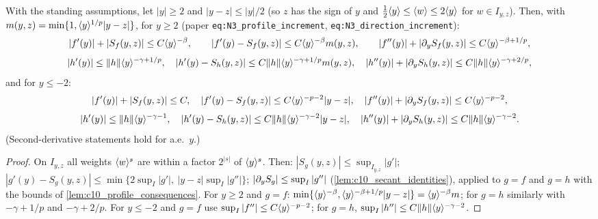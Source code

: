 \begin{lemma}
  \label{lem:c10_near_increments}
  With the standing assumptions, let $|y|\ge2$ and $|y-z|\le|y|/2$ (so $z$ has the sign of $y$ and
  $\frac12\langle y \rangle\le\langle w \rangle\le2\langle y \rangle$ for $w\in I_{y,z}$). Then, with $m(y,z)=\min\{1,\langle y \rangle^{1/p}|y-z|\}$,
  for $y\ge2$ (paper \texttt{eq:N3\_profile\_increment}, \texttt{eq:N3\_direction\_increment}):
  \[
    |f'(y)|+|S_f(y,z)|\le C\langle y \rangle^{-\beta},\qquad |f'(y)-S_f(y,z)|\le C\langle y \rangle^{-\beta}m(y,z),\qquad
    |f''(y)|+|\partial_yS_f(y,z)|\le C\langle y \rangle^{-\beta+1/p},
  \]
  \[
    |h'(y)|\le\|h\|\langle y \rangle^{-\gamma+1/p},\quad |h'(y)-S_h(y,z)|\le C\|h\|\langle y \rangle^{-\gamma+1/p}m(y,z),\quad
    |h''(y)|+|\partial_yS_h(y,z)|\le C\|h\|\langle y \rangle^{-\gamma+2/p},
  \]
  and for $y\le-2$:
  \[
    |f'(y)|+|S_f(y,z)|\le C,\quad |f'(y)-S_f(y,z)|\le C\langle y \rangle^{-p-2}|y-z|,\quad
    |f''(y)|+|\partial_yS_f(y,z)|\le C\langle y \rangle^{-p-2},
  \]
  \[
    |h'(y)|\le\|h\|\langle y \rangle^{-\gamma-1},\quad |h'(y)-S_h(y,z)|\le C\|h\|\langle y \rangle^{-\gamma-2}|y-z|,\quad
    |h''(y)|+|\partial_yS_h(y,z)|\le C\|h\|\langle y \rangle^{-\gamma-2}.
  \]
  (Second-derivative statements hold for a.e.\ $y$.)
\end{lemma}
\begin{proof}
  On $I_{y,z}$ all weights $\langle w \rangle^{s}$ are within a factor $2^{|s|}$ of $\langle y \rangle^s$. Then:
  $|S_g(y,z)|\le\sup_{I_{y,z}}|g'|$; $|g'(y)-S_g(y,z)|\le\min\{2\sup_{I}|g'|,\ |y-z|\sup_I|g''|\}$;
  $|\partial_yS_g|\le\sup_I|g''|$ (\cref{lem:c10_secant_identities}), applied to $g=f$ and $g=h$ with the bounds of
  \cref{lem:c10_profile_consequences}. For $y\ge2$ and $g=f$: $\min\{\langle y \rangle^{-\beta},\langle y \rangle^{-\beta+1/p}|y-z|\}
  =\langle y \rangle^{-\beta}m$; for $g=h$ similarly with $-\gamma+1/p$ and $-\gamma+2/p$. For $y\le-2$ and $g=f$ use
  $\sup_I|f''|\le C\langle y \rangle^{-p-2}$; for $g=h$, $\sup_I|h''|\le C\|h\|\langle y \rangle^{-\gamma-2}$.
\end{proof}

